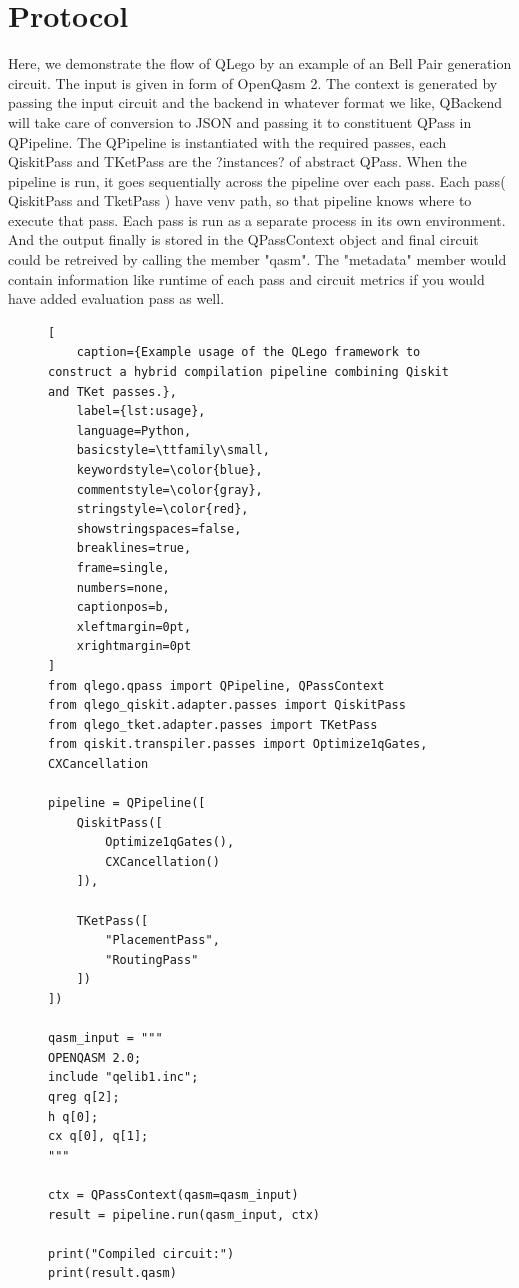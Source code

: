 \documentclass[11pt]{article}
\begin{document}
\section{Protocol}
Here, we demonstrate the flow of QLego by an example of an Bell Pair generation circuit. The input is given in form of OpenQasm 2. The context is generated by passing the input circuit and the backend in whatever format we like, QBackend will take care of conversion to JSON and passing it to constituent QPass in QPipeline. The QPipeline is instantiated with the required passes, each QiskitPass and TKetPass are the ?instances? of abstract QPass. When the pipeline is run, it goes sequentially across the pipeline over each pass. Each pass( QiskitPass and TketPass ) have venv path, so that pipeline knows where to execute that pass. Each pass is run as a separate process in its own environment. And the output finally is stored in the QPassContext object and final circuit could be retreived by calling the member "qasm". The "metadata" member would contain information like runtime of each pass and circuit metrics if you would have added evaluation pass as well.
\begin{figure}[!t]
\begin{lstlisting}[
    caption={Example usage of the QLego framework to construct a hybrid compilation pipeline combining Qiskit and TKet passes.}, 
    label={lst:usage}, 
    language=Python,
    basicstyle=\ttfamily\small,
    keywordstyle=\color{blue},
    commentstyle=\color{gray},
    stringstyle=\color{red},
    showstringspaces=false,
    breaklines=true,
    frame=single,
    numbers=none,
    captionpos=b,
    xleftmargin=0pt,
    xrightmargin=0pt
]
from qlego.qpass import QPipeline, QPassContext
from qlego_qiskit.adapter.passes import QiskitPass
from qlego_tket.adapter.passes import TKetPass
from qiskit.transpiler.passes import Optimize1qGates, CXCancellation

pipeline = QPipeline([
    QiskitPass([
        Optimize1qGates(),
        CXCancellation()
    ]),
    
    TKetPass([
        "PlacementPass",
        "RoutingPass"
    ])
])

qasm_input = """
OPENQASM 2.0;
include "qelib1.inc";
qreg q[2];
h q[0];
cx q[0], q[1];
"""

ctx = QPassContext(qasm=qasm_input)
result = pipeline.run(qasm_input, ctx)

print("Compiled circuit:")
print(result.qasm)
\end{lstlisting}
\end{figure}
\end{document}
